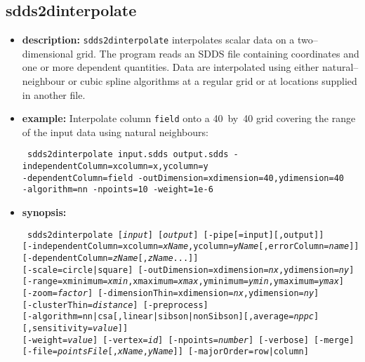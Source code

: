 \newpage
\subsection{sdds2dinterpolate}
\label{sdds2dinterpolate}

\begin{itemize}
\item {\bf description:}
{\tt sdds2dinterpolate} interpolates scalar data on a two--dimensional grid.  The program reads an SDDS file containing coordinates and one or more dependent quantities.  Data are interpolated using either natural--neighbour or cubic spline algorithms at a regular grid or at locations supplied in another file.

\item {\bf example:}
Interpolate column {\tt field} onto a 40~by~40 grid covering the range of the input data using natural neighbours:
\begin{flushleft}{\tt
sdds2dinterpolate input.sdds output.sdds -independentColumn=xcolumn=x,ycolumn=y \\
  -dependentColumn=field -outDimension=xdimension=40,ydimension=40 \\
  -algorithm=nn -npoints=10 -weight=1e-6
}\end{flushleft}

\item {\bf synopsis:}
\begin{flushleft}{\tt
sdds2dinterpolate [{\em input}] [{\em output}] [-pipe[=input][,output]] \\
  {}[-independentColumn=xcolumn={\em xName},ycolumn={\em yName}[,errorColumn={\em name}]] \\
  {}[-dependentColumn={\em zName}[,{\em zName}...]] \\
  {}[-scale=circle|square] [-outDimension=xdimension={\em nx},ydimension={\em ny}] \\
  {}[-range=xminimum={\em xmin},xmaximum={\em xmax},yminimum={\em ymin},ymaximum={\em ymax}] \\
  {}[-zoom={\em factor}] [-dimensionThin=xdimension={\em nx},ydimension={\em ny}] \\
  {}[-clusterThin={\em distance}] [-preprocess] \\
  {}[-algorithm=nn|csa[,linear|sibson|nonSibson][,average={\em nppc}][,sensitivity={\em value}]] \\
  {}[-weight={\em value}] [-vertex={\em id}] [-npoints={\em number}] [-verbose] [-merge] \\
  {}[-file={\em pointsFile}[,{\em xName},{\em yName}]] [-majorOrder=row|column]
}\end{flushleft}


\end{itemize}
